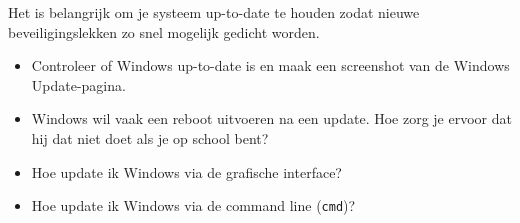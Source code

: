 Het is belangrijk om je systeem up-to-date te houden zodat nieuwe beveiligingslekken zo snel mogelijk gedicht worden.
\begin{itemize}
\item Controleer of Windows up-to-date is en maak een screenshot van de Windows Update-pagina.
\item Windows wil vaak een reboot uitvoeren na een update. Hoe zorg je ervoor dat hij dat niet doet als je op school bent?
\item Hoe update ik Windows via de grafische interface?
\item Hoe update ik Windows via de command line (\texttt{cmd})?
\end{itemize}

